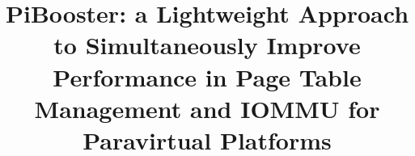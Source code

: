 \documentclass[10pt,preprint]{sigplanconf}
\begin{document}
\newcommand{\name}{PiBooster\xspace}
\newcommand{\eat}[1]{}  %
\newcommand{\authcomment}[3]{\textcolor{#3}{#1 says: #2}}\newcommand{\yueqiang}[1]{\authcomment{Yueqiang}{#1}{red}}
\newcommand{\zhi}[1]{\authcomment{Zhi}{#1}{red}}
 \newcommand{\mypara}[1]{\vspace{2pt}\noindent\textbf{{#1. }}}


\date{}

\title{\Large \bf PiBooster: a Lightweight Approach to Simultaneously Improve Performance in Page Table Management and IOMMU for Paravirtual Platforms}


\maketitle
\end{document}
